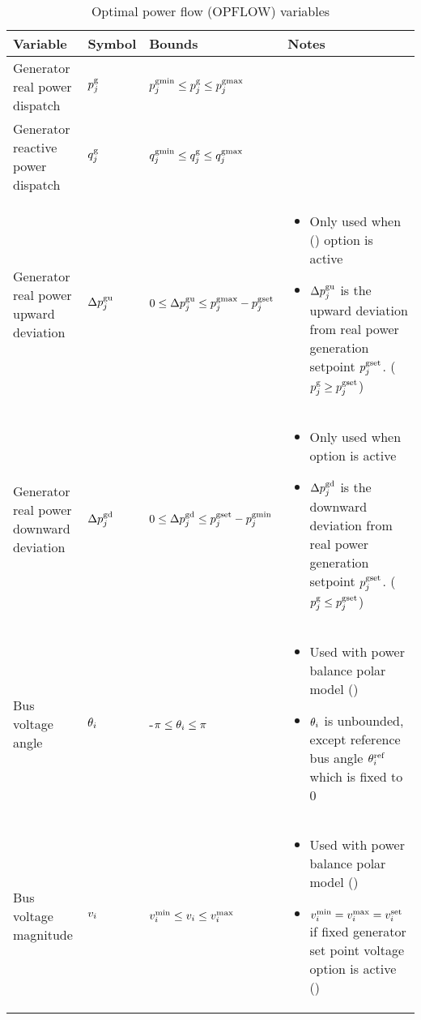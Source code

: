 \begin{table}[h]
\caption{Optimal power flow (OPFLOW) variables}
\small
  \begin{tabular}{|p{}|p{}|p{}|p{}|}
   \hline
    \textbf{Variable} & \textbf{Symbol} & \textbf{Bounds} & \textbf{Notes} \\
    \hline
    Generator real power dispatch & $p^\text{g}_j$ & $p^\text{gmin}_j \le p^\text{g}_j \le p^\text{gmax}_j$ & ~\\
    \hline
    Generator reactive power dispatch & $q^\text{g}_j$ & $q^\text{gmin}_j \le q^\text{g}_j \le q^\text{gmax}_j$ & ~ \\
    \hline
    Generator real power upward deviation & $\Delta{p}^\text{gu}_j$ & $0 \le \Delta{p}^\text{gu}_j \le p^\text{gmax}_j - p^{\text{gset}}_j$ & \begin{itemize} \item Only used when (\option{\opflowgensetpoint}) option is active \item $\Delta{p}^\text{gu}_j$ is the upward deviation from real power generation setpoint $p^{\text{gset}}_j$. ($p^\text{g}_j \ge p^{\text{gset}}_j$) \end{itemize} \\
    \hline
    Generator real power downward deviation & $\Delta{p}^\text{gd}_j$ & $0 \le \Delta{p}^\text{gd}_j \le p^{\text{gset}}_j- p^\text{gmin}_j$ & \begin{itemize} \item Only used when \option{\opflowgensetpoint} option is active \item $\Delta{p}^\text{gd}_j$ is the downward deviation from real power generation setpoint $p^{\text{gset}}_j$. ($p^\text{g}_j \le p^{\text{gset}}_j$)\end{itemize} \\
    \hline
    Bus voltage angle & $\theta_i$ & -$\pi \le \theta_i \le \pi$ & 
    \begin{itemize} 
    	\item Used with power balance polar model (\option{\opflowmodel~\pbcar}) 
	\item $\theta_i$ is unbounded, except reference bus angle $\theta^\text{ref}_i$ which is fixed to 0 
    \end{itemize} \\
    \hline
    Bus voltage magnitude & $v_i$ & $v^\text{min}_i \le v_i \le v^\text{max}_i$ & \begin{itemize} \item Used with power balance polar model (\option{\opflowmodel~\pbpol})\item $v^\text{min}_i = v^\text{max}_i = v^\text{set}_i$ if fixed generator set point voltage option is active (\option{\opflowgensetpoint}) \end{itemize} \\

\end{tabular}
\end{table}
